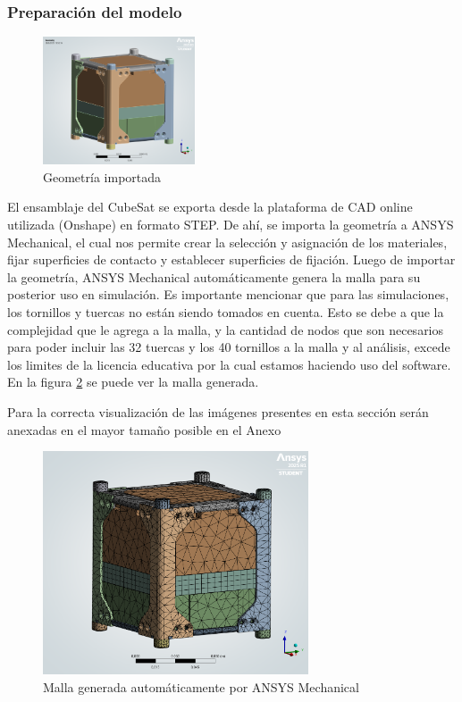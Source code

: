    \subsubsection{Preparación del modelo}
      \begin{figure}
        \vspace{-0.5cm}
        \centering
        \includegraphics[width=0.4\textwidth]{image/fem/ansys_cubesat-geometry.png}
        \caption{Geometría importada}
        \label{fig:fem_geo}
      \end{figure}
      \hspace*{2em}
      El ensamblaje del CubeSat se exporta desde la plataforma de CAD online utilizada (Onshape) en formato STEP. De
      ahí, se importa la geometría a ANSYS Mechanical, el cual nos permite crear la selección y asignación de los
      materiales, fijar superficies de contacto y establecer superficies de fijación. Luego de importar la geometría,
      ANSYS Mechanical automáticamente genera la malla para su posterior uso en simulación.  Es importante mencionar que
      para las simulaciones, los tornillos y tuercas no están siendo tomados en cuenta. Esto se debe a que la
      complejidad que le agrega a la malla, y la cantidad de nodos que son necesarios para poder incluir las 32 tuercas
      y los 40 tornillos a la malla y al análisis, excede los limites de la licencia educativa por la cual estamos
      haciendo uso del software. En la figura \ref{fig:fem_mesh} se puede ver la malla generada.

      Para la correcta visualización de las imágenes presentes en esta sección serán anexadas en el mayor tamaño posible
      en el Anexo

      \begin{figure}[H]
        \centering
        \includegraphics[width=0.7\textwidth]{image/fem/ansys_cubesat-mesh.png}
        \caption{Malla generada automáticamente por ANSYS Mechanical}
        \label{fig:fem_mesh}
      \end{figure}

